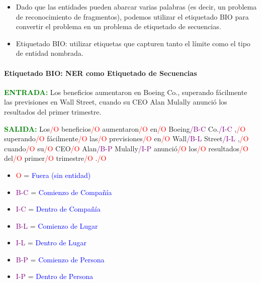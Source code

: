 \begin{itemize}
  \item Dado que las entidades pueden abarcar varias palabras (es decir, un problema de reconocimiento de fragmentos), podemos utilizar el etiquetado BIO \cite{ramshaw1999text} para convertir el problema en un problema de etiquetado de secuencias.
  \item Etiquetado BIO: utilizar etiquetas que capturen tanto el límite como el tipo de entidad nombrada.
\end{itemize}

\paragraph{Etiquetado BIO: NER como Etiquetado de Secuencias}
\textcolor{green}{\textbf{ENTRADA:}}
Los beneficios aumentaron en Boeing Co., superando fácilmente las previsiones en Wall Street, cuando su CEO Alan Mulally anunció los resultados del primer trimestre.  \vspace{0.5cm}

\textcolor{green}{\textbf{SALIDA:}}
Los\textcolor{red}{/O} beneficios\textcolor{red}{/O} aumentaron\textcolor{red}{/O} en\textcolor{red}{/O} Boeing\textcolor{purple}{/B-C} Co.\textcolor{purple}{/I-C} ,\textcolor{red}{/O} superando\textcolor{red}{/O} fácilmente\textcolor{red}{/O} las\textcolor{red}{/O} previsiones\textcolor{red}{/O} en\textcolor{red}{/O} Wall\textcolor{purple}{/B-L} Street\textcolor{purple}{/I-L} ,\textcolor{red}{/O} cuando\textcolor{red}{/O} su\textcolor{red}{/O} CEO\textcolor{red}{/O} Alan\textcolor{purple}{/B-P} Mulally\textcolor{purple}{/I-P} anunció\textcolor{red}{/O} los\textcolor{red}{/O} resultados\textcolor{red}{/O} del\textcolor{red}{/O} primer\textcolor{red}{/O} trimestre\textcolor{red}{/O} .\textcolor{red}{/O}  \vspace{0.5cm}

\begin{itemize}
  \item \textcolor{red}{O} = \textcolor{blue}{Fuera (sin entidad)}
  \item \textcolor{purple}{B-C} = \textcolor{blue}{Comienzo de Compañía}
  \item \textcolor{purple}{I-C} = \textcolor{blue}{Dentro de Compañía}
  \item \textcolor{purple}{B-L} = \textcolor{blue}{Comienzo de Lugar}
  \item \textcolor{purple}{I-L} = \textcolor{blue}{Dentro de Lugar}
  \item \textcolor{purple}{B-P} = \textcolor{blue}{Comienzo de Persona}
  \item \textcolor{purple}{I-P} = \textcolor{blue}{Dentro de Persona}
\end{itemize}

